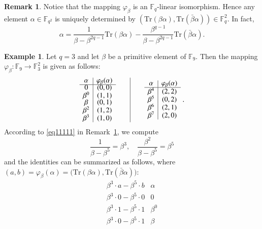 \documentclass{aims}
\numberwithin{equation}{section}
\theoremstyle{definition}
\newtheorem{example}[theorem]{Example}
\newtheorem{remark}[theorem]{Remark}
\newcommand{\F}{\mathbb{F}}
\newcommand{\Tr}{\mathrm{Tr}}
\begin{document}
\begin{remark}\label{rem:inverse}
	Notice that the mapping $\varphi_\beta$ is an $\F_q$-linear isomorphism. Hence any element $\alpha \in \F_{q^2}$ is uniquely determined by $(\Tr(\beta\alpha), \Tr(\bar{\beta}\alpha)) \in \F_q^2$. In fact,
	\begin{equation}\label{eq11111}
		\alpha = \frac{1}{\beta - \beta^{2q-1}} \Tr(\beta\alpha) - \frac{\beta^{q-1}}{\beta - \beta^{2q-1}} \Tr(\bar{\beta}\alpha).
	\end{equation}
\end{remark}



\begin{example}\label{ex:q3}
	Let $q = 3$ and let $\beta$ be a primitive element of $\F_9$. Then the mapping $\varphi_\beta: \F_9 \to \F_3^2$ is given as follows:
	\[
	\renewcommand{\arraystretch}{0.8}
	\begin{array}{c|c}
		\alpha & \varphi_\beta(\alpha) \\ \hline
		0 & (0,0) \\
		\beta^0 & (1,1) \\
		\beta & (0,1) \\
		\beta^2 & (1,2) \\
		\beta^3 & (1,0)
	\end{array}
\hspace{0.7cm}\vrule\hspace{0.7cm}
	\begin{array}{c|c}
		\alpha & \varphi_\beta(\alpha) \\ \hline
		\beta^4 & (2,2) \\
		\beta^5 & (0,2) \\
		\beta^6 & (2,1) \\
		\beta^7 & (2,0)
	\end{array}~.
	\]
 According to \eqref{eq11111} in Remark~\ref{rem:inverse}, we compute
	\[
	\frac{1}{\beta - \beta^5} = \beta^3,\quad \frac{\beta^{2}}{\beta - \beta^{5}} = \beta^5
	\]
	and the identities can be summarized as follows, where \((a,b) = \varphi_\beta(\alpha) = \bigl(\Tr(\beta\alpha), \Tr(\bar{\beta}\alpha)\bigr)\):
	\[
	\renewcommand{\arraystretch}{0.8}
	\begin{array}{c|c}
		\beta^3 \cdot a - \beta^5 \cdot b & \alpha \\ \hline
		\beta^3 \cdot 0 - \beta^5 \cdot 0 & 0 \\
		\beta^3 \cdot 1 - \beta^5 \cdot 1 & \beta^0 \\
		\beta^3 \cdot 0 - \beta^5 \cdot 1 & \beta \\

\end{array}\]
\end{example}
\end{document}
